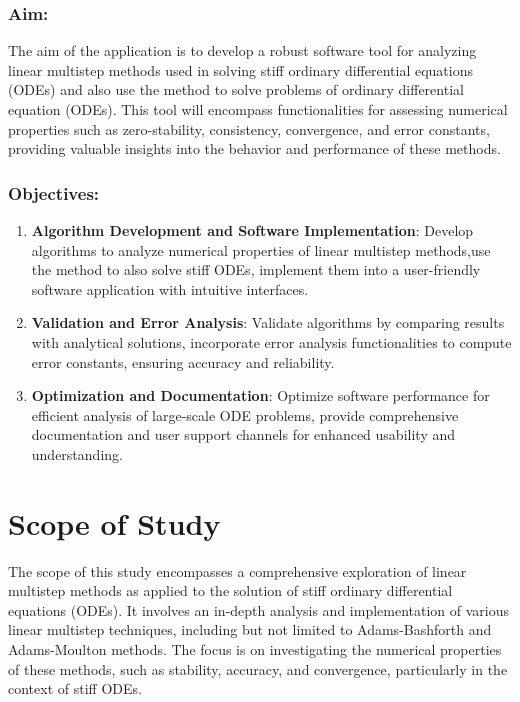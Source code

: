 \documentclass[a4paper, twoside]{report} %
\begin{document}
	\subsubsection{Aim:}
	The aim of the application is to develop a robust software tool for analyzing linear multistep methods used in solving stiff ordinary differential equations (ODEs) and also use the method to solve problems of ordinary differential equation (ODEs).
	This tool will encompass functionalities for assessing numerical properties such as zero-stability, consistency, convergence, and error constants, providing valuable insights into the behavior and performance of these methods.
	\subsubsection{Objectives:}
	\begin{enumerate}
		\item \textbf{Algorithm Development and Software Implementation}: Develop algorithms to analyze numerical properties of linear multistep methods,use the method to also solve stiff ODEs, implement them into a user-friendly software application with intuitive interfaces.

		\item \textbf{Validation and Error Analysis}: Validate algorithms by comparing results with analytical solutions, incorporate error analysis functionalities to compute error constants, ensuring accuracy and reliability.

		\item \textbf{Optimization and Documentation}: Optimize software performance for efficient analysis of large-scale ODE problems, provide comprehensive documentation and user support channels for enhanced usability and understanding.

	\end{enumerate}

	\section{Scope of Study}
	The scope of this study encompasses a comprehensive exploration of linear multistep methods as applied to the solution of stiff ordinary differential equations (ODEs). It involves an in-depth analysis and implementation of various linear multistep techniques, including but not limited to Adams-Bashforth and Adams-Moulton methods. The focus is on investigating the numerical properties of these methods, such as stability, accuracy, and convergence, particularly in the context of stiff ODEs.
\end{document}
